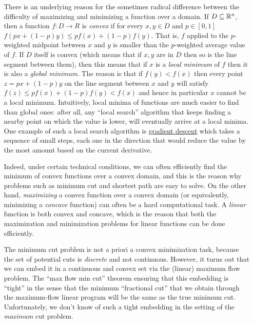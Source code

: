 There is an underlying reason for the sometimes radical difference
between the difficulty of maximizing and minimizing a function over a
domain. If \(D \subseteq {\mathbb{R}}^n\), then a function \(f:D \rightarrow R\)
is \emph{convex} if for every \(x,y \in D\) and \(p\in [0,1]\)
\(f(px+(1-p)y) \leq pf(x) + (1-p)f(y)\). That is, \(f\) applied to the
\(p\)-weighted midpoint between \(x\) and \(y\) is smaller than the
\(p\)-weighted average value of \(f\). If \(D\) itself is convex (which
means that if \(x,y\) are in \(D\) then so is the line segment between
them), then this means that if \(x\) is a \emph{local minimum} of \(f\)
then it is also a \emph{global minimum}. The reason is that if
\(f(y)<f(x)\) then every point \(z=px+(1-p)y\) on the line segment
between \(x\) and \(y\) will satisfy
\(f(z) \leq p f(x) + (1-p)f(y) < f(x)\) and hence in particular \(x\)
cannot be a local minimum. Intuitively, local minima of functions are
much easier to find than global ones: after all, any ``local search''
algorithm that keeps finding a nearby point on which the value is lower,
will eventually arrive at a local minima. One example of such a local
search algorithm is
\href{https://en.wikipedia.org/wiki/Gradient_descent}{gradient descent}
which takes a sequence of small steps, each one in the direction that
would reduce the value by the most amount based on the current
derivative.

Indeed, under certain technical conditions, we can often efficiently
find the minimum of convex functions over a convex domain, and this is
the reason why problems such as minimum cut and shortest path are easy
to solve. On the other hand, \emph{maximizing} a convex function over a
convex domain (or equivalently, minimizing a \emph{concave} function)
can often be a hard computational task. A \emph{linear} function is both
convex and concave, which is the reason that both the maximization and
minimization problems for linear functions can be done efficiently.

The minimum cut problem is not a priori a convex minimization task,
because the set of potential cuts is \emph{discrete} and not continuous.
However, it turns out that we can embed it in a continuous and convex
set via the (linear) maximum flow problem. The ``max flow min cut''
theorem ensuring that this embedding is ``tight'' in the sense that the
minimum ``fractional cut'' that we obtain through the maximum-flow
linear program will be the same as the true minimum cut. Unfortunately,
we don't know of such a tight embedding in the setting of the
\emph{maximum} cut problem.

